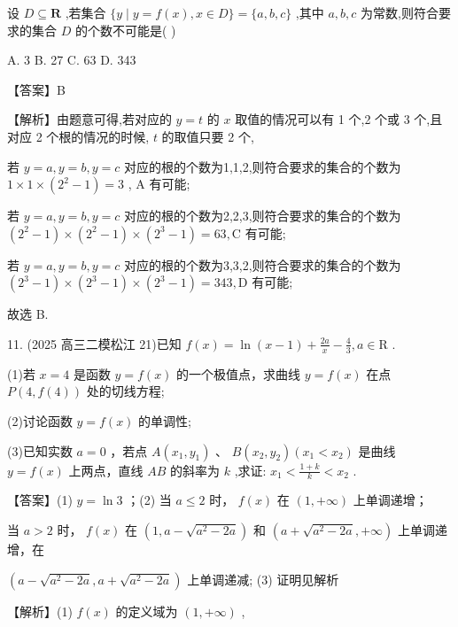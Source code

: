 \documentclass[10pt]{article}
\begin{document}
设 \(D \subseteq  \mathbf{R}\) ,若集合 \(\{ y \mid  y = f\left( x\right) ,x \in  D\}  = \{ a,b,c\}\) ,其中 \(a,b,c\) 为常数,则符合要求的集合 \(D\) 的个数不可能是( )

A. 3 B. 27 C. 63 D. 343

【答案】B

【解析】由题意可得,若对应的 \(y = t\) 的 \(x\) 取值的情况可以有 1 个,2 个或 3 个,且对应 2 个根的情况的时候, \(t\) 的取值只要 2 个,

若 \(y = a,y = b,y = c\) 对应的根的个数为1,1,2,则符合要求的集合的个数为 \(1 \times  1 \times  \left( {{2}^{2} - 1}\right)  = 3\) , A 有可能;

若 \(y = a,y = b,y = c\) 对应的根的个数为2,2,3,则符合要求的集合的个数为 \(\left( {{2}^{2} - 1}\right)  \times  \left( {{2}^{2} - 1}\right)  \times  \left( {{2}^{3} - 1}\right)  = {63},\mathrm{C}\) 有可能;

若 \(y = a,y = b,y = c\) 对应的根的个数为3,3,2,则符合要求的集合的个数为 \(\left( {{2}^{3} - 1}\right)  \times  \left( {{2}^{3} - 1}\right)  \times  \left( {{2}^{3} - 1}\right)  = {343},\mathrm{D}\) 有可能;

故选 B.

11. (2025 高三二模松江 21)已知 \(f\left( x\right)  = \ln \left( {x - 1}\right)  + \frac{2a}{x} - \frac{4}{3},a \in  \mathrm{R}\) .

(1)若 \(x = 4\) 是函数 \(y = f\left( x\right)\) 的一个极值点，求曲线 \(y = f\left( x\right)\) 在点 \(P\left( {4,f\left( 4\right) }\right)\) 处的切线方程;

(2)讨论函数 \(y = f\left( x\right)\) 的单调性;

(3)已知实数 \(a = 0\) ，若点 \(A\left( {{x}_{1},{y}_{1}}\right)\) 、 \(B\left( {{x}_{2},{y}_{2}}\right) \left( {{x}_{1} < {x}_{2}}\right)\) 是曲线 \(y = f\left( x\right)\) 上两点，直线 \({AB}\) 的斜率为 \(k\) ,求证: \({x}_{1} < \frac{1 + k}{k} < {x}_{2}\) .

【答案】(1) \(y = \ln 3\) ；(2) 当 \(a \leq  2\) 时， \(f\left( x\right)\) 在 \(\left( {1, + \infty }\right)\) 上单调递增；

当 \(a > 2\) 时， \(f\left( x\right)\) 在 \(\left( {1,a - \sqrt{{a}^{2} - {2a}}}\right)\) 和 \(\left( {a + \sqrt{{a}^{2} - {2a}}, + \infty }\right)\) 上单调递增，在

\(\left( {a - \sqrt{{a}^{2} - {2a}},a + \sqrt{{a}^{2} - {2a}}}\right)\) 上单调递减; (3) 证明见解析

【解析】(1) \(f\left( x\right)\) 的定义域为 \(\left( {1, + \infty }\right)\) ,
\end{document}
